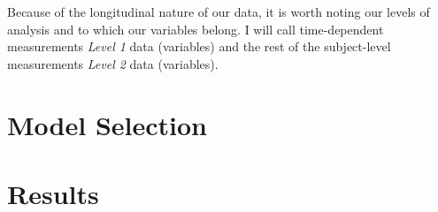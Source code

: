 \documentclass[12pt,twoside,leqno,fleqn,letterpaper]{article}
\theoremstyle{definition}
\theoremstyle{definition}
\newcommand{\detailtexcount}[1]{ %
\immediate\write18{texcount -merge -sum #1.tex > #1.wcdetail }%
%
}
\begin{document}
Because of the longitudinal nature of our data, it is worth noting our levels of analysis and to which our variables belong. I will call time-dependent measurements \emph{\textcolor[RGB]{208, 2, 27}{Level 1}} data (variables) and the rest of the subject-level measurements \emph{\textcolor[RGB]{74, 144, 226}{Level 2}} data (variables). 

\subsection{}

\section{Model Selection}


\section{Results}

\singlespacing
% 
% 
\printbibliography
\end{document}
